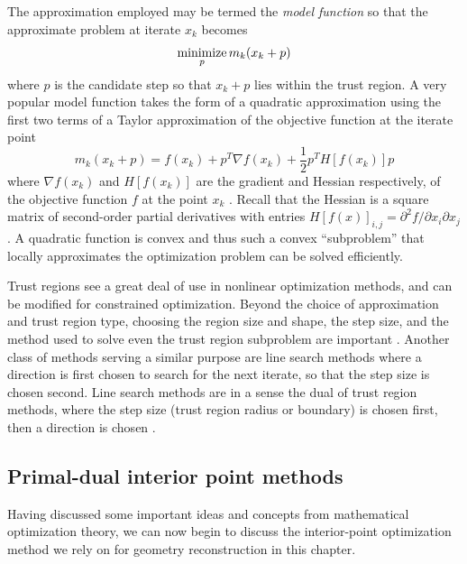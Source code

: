 The approximation employed may be termed the \emph{model function} so that the approximate problem at iterate $x_k$ becomes
\begin{equation}
\operatornamewithlimits{minimize}_p m_k(x_k + p)
\end{equation}
where $p$ is the candidate step so that $x_k + p$ lies within the trust region. A very popular model function takes the form of a quadratic approximation using the first two terms of a Taylor approximation of the objective function at the iterate point
\begin{equation}
m_k(x_k + p) = f(x_k) + p^T \nabla f(x_k) + \frac{1}{2} p^T H[f(x_k)] p
\end{equation}
where $\nabla f(x_k)$ and $H[f(x_k)]$ are the gradient and Hessian respectively, of the objective function $f$ at the point $x_k$ \citep{More83}. Recall that the Hessian is a square matrix of second-order partial derivatives with entries $H[f(x)]_{i,j} = \partial^2 f/\partial x_i \partial x_j$. A quadratic function is convex and thus such a convex ``subproblem'' that locally approximates the optimization problem can be solved efficiently.

Trust regions see a great deal of use in nonlinear optimization methods, and can be modified for constrained optimization. Beyond the choice of approximation and trust region type, choosing the region size and shape, the step size, and the method used to solve even the trust region subproblem are important \citep[ch. 4]{Nocedal06}. Another class of methods serving a similar purpose are line search methods where a direction is first chosen to search for the next iterate, so that the step size is chosen second. Line search methods are in a sense the dual of trust region methods, where the step size (trust region radius or boundary) is chosen first, then a direction is chosen \citep[ch. 1]{Nocedal06}.

\subsection{Primal-dual interior point methods} \label{ssec:interiorPoint}
Having discussed some important ideas and concepts from mathematical optimization theory, we can now begin to discuss the interior-point optimization method we rely on for geometry reconstruction in this chapter.

